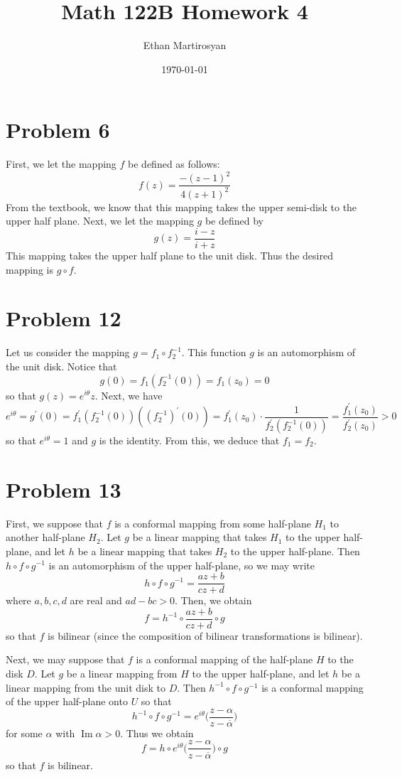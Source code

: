 \documentclass[12pt]{article}
\DeclareMathOperator{\imag}{Im}
\begin{document}
 
\title{Math 122B Homework 4}
\author{Ethan Martirosyan}
\date{\today}
\maketitle
{}
\hfuzz=50pt
\section*{Problem 6}
First, we let the mapping $f$ be defined as follows:
\[
f(z) = \frac{-(z-1)^2}{4(z+1)^2}
\] From the textbook, we know that this mapping takes the upper semi-disk to the upper half plane. Next, we let the mapping $g$ be defined by
\[
g(z) = \frac{i-z}{i+z}
\] This mapping takes the upper half plane to the unit disk. Thus the desired mapping is $g \circ f$.
\newpage
\section*{Problem 12}
Let us consider the mapping $g = f_1 \circ f_2^{-1}$. This function $g$ is an automorphism of the unit disk. Notice that
\[
g(0) = f_1(f_2^{-1}(0)) = f_1(z_0) = 0
\] so that $g(z) = e^{i\theta} z$. Next, we have
\[
e^{i\theta} = g^\prime(0) = f_1^\prime(f_2^{-1}(0)) ((f_2^{-1})^\prime(0)) = f_1^\prime(z_0) \cdot \frac{1}{f_2^\prime(f_2^{-1}(0))} = \frac{f_1^\prime(z_0)}{f_2^\prime(z_0)} > 0 
\] so that $e^{i\theta} = 1$ and $g$ is the identity. From this, we deduce that $f_1 = f_2$. 
\newpage
\section*{Problem 13}
First, we suppose that $f$ is a conformal mapping from some half-plane $H_1$ to another half-plane $H_2$. Let $g$ be a linear mapping that takes $H_1$ to the upper half-plane, and let $h$ be a linear mapping that takes $H_2$ to the upper half-plane. Then $h \circ f \circ g^{-1}$ is an automorphism of the upper half-plane, so we may write
\[
h \circ f \circ g^{-1} = \frac{az+b}{cz+d}
\] where $a,b,c,d$ are real and $ad - bc > 0$. Then, we obtain
\[
f = h^{-1} \circ \frac{az+b}{cz+d} \circ g
\] so that $f$ is bilinear (since the composition of bilinear transformations is bilinear).

Next, we may suppose that $f$ is a conformal mapping of the half-plane $H$ to the disk $D$. Let $g$ be a linear mapping from $H$ to the upper half-plane, and let $h$ be a linear mapping from the unit disk to $D$. Then $h^{-1} \circ f \circ g^{-1}$ is a conformal mapping of the upper half-plane onto $U$ so that
\[
h^{-1} \circ f \circ g^{-1} = e^{i\theta} \bigg(\frac{z-\alpha}{z-\overline{\alpha}}\bigg)
\] for some $\alpha$ with $\imag \alpha > 0$. Thus we obtain
\[
f = h \circ e^{i\theta} \bigg(\frac{z-\alpha}{z-\overline{\alpha}}\bigg) \circ g
\] so that $f$ is bilinear.
\end{document}
